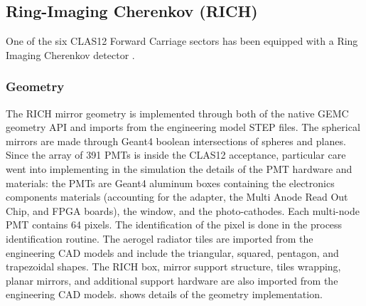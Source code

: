 \subsection{Ring-Imaging Cherenkov (RICH)}

One of the six CLAS12 Forward Carriage sectors has been equipped with a Ring Imaging Cherenkov detector \cite{rich-nim}.

\subsubsection{Geometry}
The RICH mirror geometry is implemented through both of the native GEMC geometry API and imports from the engineering model STEP files.
The spherical mirrors are made through Geant4 boolean intersections of spheres and planes.
Since the array of 391 PMTs is inside the CLAS12 acceptance, particular care went into implementing in the
simulation the details of the PMT hardware and materials: the PMTs are Geant4 aluminum boxes containing the electronics components materials
(accounting for the adapter, the  Multi Anode Read Out Chip, and FPGA boards), the window, and the photo-cathodes.
Each multi-node PMT contains 64 pixels. The identification of the pixel is done in the process identification routine.
The aerogel radiator tiles are imported from the engineering CAD models and include the triangular, squared, pentagon, and trapezoidal shapes.
The RICH box, mirror support structure, tiles wrapping, planar mirrors, and additional support hardware are also imported from the engineering CAD models.
 shows details of the geometry implementation.

